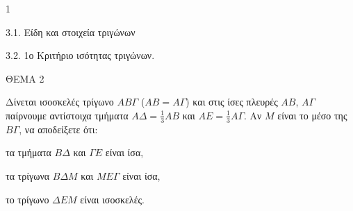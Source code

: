 \begin{ylh}{1}
    \item 3.1. Είδη και στοιχεία τριγώνων
    \item 3.2. 1ο Κριτήριο ισότητας τριγώνων.
\end{ylh}

ΘΕΜΑ 2

Δίνεται ισοσκελές τρίγωνο $AB\Gamma$ ($AB=A\Gamma$) και στις ίσες πλευρές $AB$, $A\Gamma$ παίρνουμε αντίστοιχα τμήματα $A\Delta = \frac{1}{3} AB$ και $AE = \frac{1}{3} A\Gamma$. Αν $M$ είναι το μέσο της $B\Gamma$, να αποδείξετε ότι:

\begin{alist}
\item τα τμήματα $B\Delta$ και $\Gamma E$ είναι ίσα, 
\item τα τρίγωνα $B\Delta M$ και $M E\Gamma$ είναι ίσα, 
\item το τρίγωνο $\Delta EM$ είναι ισοσκελές. 

\begin{center}
\end{center}
\end{alist}

